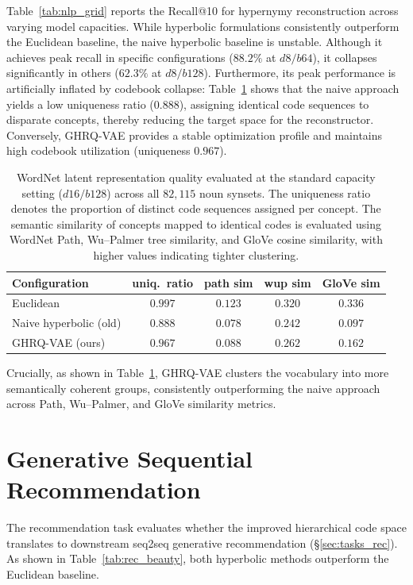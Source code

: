 \documentclass[12pt]{report}
\begin{document}
Table~\ref{tab:nlp_grid} reports the Recall@10 for hypernymy reconstruction across varying model capacities. While hyperbolic formulations consistently outperform the Euclidean baseline, the naive hyperbolic baseline is unstable. Although it achieves peak recall in specific configurations ($88.2\%$ at $d8/b64$), it collapses significantly in others ($62.3\%$ at $d8/b128$). Furthermore, its peak performance is artificially inflated by codebook collapse: Table~\ref{tab:nlp_repr} shows that the naive approach yields a low uniqueness ratio ($0.888$), assigning identical code sequences to disparate concepts, thereby reducing the target space for the reconstructor. Conversely, GHRQ-VAE provides a stable optimization profile and maintains high codebook utilization (uniqueness $0.967$). 

\begin{table}[h]
\centering
\caption{WordNet latent representation quality evaluated at the standard capacity setting ($d16/b128$) across all $82{,}115$ noun synsets. The uniqueness ratio denotes the proportion of distinct code sequences assigned per concept. The semantic similarity of concepts mapped to identical codes is evaluated using WordNet Path, Wu--Palmer tree similarity, and GloVe cosine similarity, with higher values indicating tighter clustering.}
\label{tab:nlp_repr}
\begin{tabular}{lcccc}
\hline
Configuration & uniq.\ ratio & path sim & wup sim & GloVe sim \\
\hline
Euclidean & $0.997$ & $0.123$ & $0.320$ & $0.336$ \\
Naive hyperbolic (old) & $0.888$ & $0.078$ & $0.242$ & $0.097$ \\
GHRQ-VAE (ours) & $0.967$ & $0.088$ & $0.262$ & $0.162$ \\
\hline
\end{tabular}
\end{table}

Crucially, as shown in Table~\ref{tab:nlp_repr}, GHRQ-VAE clusters the vocabulary into more semantically coherent groups, consistently outperforming the naive approach across Path, Wu--Palmer, and GloVe similarity metrics.

\section{Generative Sequential Recommendation}
\label{sec:exp_rec}

The recommendation task evaluates whether the improved hierarchical code space translates to downstream seq2seq generative recommendation (\S\ref{sec:tasks_rec}). As shown in Table~\ref{tab:rec_beauty}, both hyperbolic methods outperform the Euclidean baseline. 
\end{document}
